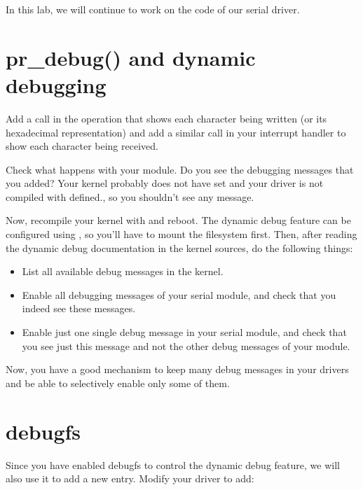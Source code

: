 
In this lab, we will continue to work on the code of our serial driver.

\section{pr\_debug() and dynamic debugging}

Add a  call in the  operation that shows
each character being written (or its hexadecimal representation) and
add a similar  call in your interrupt handler to show
each character being received.

Check what happens with your module. Do you see the debugging messages
that you added? Your kernel probably does not have
 set and your driver is not compiled with
 defined., so you shouldn't see any message.

Now, recompile your kernel with  and reboot. The
dynamic debug feature can be configured using , so you'll have
to mount the  filesystem first. Then, after reading the dynamic
debug documentation in the kernel sources, do the following things:

\begin{itemize}

\item List all available debug messages in the kernel.

\item Enable all debugging messages of your serial module, and check
  that you indeed see these messages.

\item Enable just one single debug message in your serial module, and
  check that you see just this message and not the other debug
  messages of your module.

\end{itemize}

Now, you have a good mechanism to keep many debug messages in your
drivers and be able to selectively enable only some of them.

\section{debugfs}

Since you have enabled debugfs to control the dynamic debug feature,
we will also use it to add a new  entry. Modify your driver to
add:

